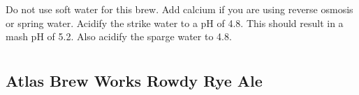 \documentclass[10pt,oneside]{scrbook}
\begin{document}

\begin{methodandtiming}
 
\begin{mashsteps}
\end{mashsteps}

\begin{fermentationsteps}
\end{fermentationsteps}

\begin{directions}
Do not use soft water for this brew. Add calcium if you are using reverse
osmosis or spring water. Acidify the strike water to a pH of 4.8. This should
result in a mash pH of 5.2. Also acidify the sparge water to 4.8.
\end{directions}

\end{methodandtiming}

\begin{ingredientsblock}

\begin{malts}
\end{malts}

\begin{hops}
\end{hops}

\begin{yeasts}
\end{yeasts}

\end{ingredientsblock}

\part{\styleamericanwheatorrye}

\chapter*{Atlas Brew Works Rowdy Rye Ale}
\end{document}
